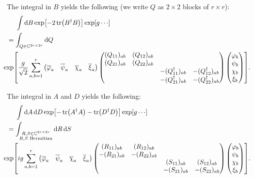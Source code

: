 \documentclass{article}
\begin{document}
The integral in $B$ yields the following (we write $Q$ as $2\times 2$ blocks of $r\times r$):
\begin{align*}
    & \phantom{{}={}} \int \dd{B} \exp[-2\tr(B^\dagger B)] \exp[g \cdots] \\
    &= \int_{Q\in \mathbb{C}^{2r\times 2r}} \dd{Q} \\
    &{\phantom{{}={}}} \hspace{-2em} \exp[\frac{g}{\sqrt{2}}\sum_{a,b=1}^r \begin{pmatrix}
        \overline{\varphi}_a & \overline{\psi}_a & \overline{\chi}_a & \overline{\xi}_a
    \end{pmatrix} \begin{pmatrix}
        (Q_{11})_{ab} & (Q_{12})_{ab} & & \\
        (Q_{21})_{ab} & (Q_{22})_{ab} & & \\
        & & -(Q^\dagger_{11})_{ab} & -(Q^\dagger_{12})_{ab} \\
        & & -(Q^\dagger_{21})_{ab} & -(Q^\dagger_{22})_{ab}
    \end{pmatrix} \begin{pmatrix}
        \varphi_b \\ \psi_b \\ \chi_b  \\ \xi_b
    \end{pmatrix}].
\end{align*}

The integral in $A$ and $D$ yields the following:
\begin{align*}
    & \phantom{{}={}} \int \dd{A} \dd{D} \exp[-\tr(A^\dagger A) - \tr(D^\dagger D)] \exp[g \cdots] \\
    &= \int_{\substack{R,S\in \mathbb{C}^{2r\times 2r} \\ R,S \text{ Hermitian}}} \dd{R} \dd{S} \\
    &{\phantom{{}={}}} \hspace{-2em} \exp[i g\sum_{a,b=1}^r \begin{pmatrix}
        \overline{\varphi}_a & \overline{\psi}_a & \overline{\chi}_a & \overline{\xi}_a
    \end{pmatrix} \begin{pmatrix}
        (R_{11})_{ab} & (R_{12})_{ab} & & \\
        -(R_{21})_{ab} & -(R_{22})_{ab} & & \\
        & & (S_{11})_{ab} & (S_{12})_{ab}  \\
        & & -(S_{21})_{ab} & -(S_{22})_{ab}
    \end{pmatrix} \begin{pmatrix}
        \varphi_b \\ \psi_b \\ \chi_b  \\ \xi_b
    \end{pmatrix}].
\end{align*}
\end{document}

